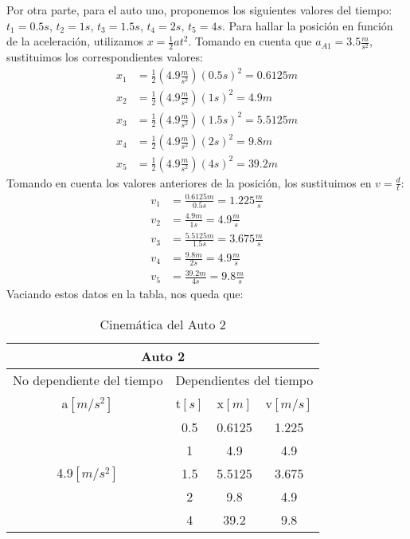 \documentclass[letterpaper,12pt]{article}
\begin{document}
\begin{enumerate}
Por otra parte, para el auto uno, proponemos los siguientes valores del tiempo: $t_1 = 0.5 s$, $t_2 = 1 s$, $t_3 = 1.5 s$, $t_4 = 2 s$, $t_5 = 4 s$. Para hallar la posición en función de la aceleración, utilizamos $x=\frac{1}{2} at^2$. Tomando en cuenta que $a_{A1}=3.5 \tfrac{m}{s^2}$, sustituimos los correspondientes valores:
\begin{align*}
    x_{1}&=\frac{1}{2}(4.9 \tfrac{m}{s^2})(0.5 s)^2 = 0.6125 m\\
    x_{2}&=\frac{1}{2}(4.9 \tfrac{m}{s^2})(1 s)^2 = 4.9 m\\
    x_{3}&=\frac{1}{2}(4.9 \tfrac{m}{s^2})(1.5 s)^2 = 5.5125 m \\
    x_{4}&=\frac{1}{2}(4.9 \tfrac{m}{s^2})(2 s)^2 = 9.8 m\\
    x_{5}&=\frac{1}{2}(4.9 \tfrac{m}{s^2})(4 s)^2 = 39.2 m
\end{align*}
Tomando en cuenta los valores anteriores de la posición, los sustituimos en $v=\frac{d}{t}$:
\begin{align*}
    v_{1}&=\frac{0.6125 m}{0.5 s}= 1.225 \tfrac{m}{s}\\
    v_{2}&=\frac{4.9 m}{1 s}= 4.9 \tfrac{m}{s}\\
    v_{3}&=\frac{5.5125 m}{1.5 s}= 3.675 \tfrac{m}{s}\\
    v_{4}&=\frac{9.8 m}{2 s}= 4.9\tfrac{m}{s} \\
    v_{5}&=\frac{39.2 m}{4 s}= 9.8 \tfrac{m}{s}
\end{align*}
Vaciando estos datos en la tabla, nos queda que:
\begin{table}[h]
\begin{center}
\begin{tabular}{ c | c | c | c | c |c }
\hline \hline
    \multicolumn{6}{c}{Auto 2} \\ \hline 
    \multicolumn{3}{c}{No dependiente del tiempo} & \multicolumn{3}{|c}{Dependientes del tiempo} \\ \hline
    \multicolumn{3}{c|}{a$[m/s^2]$} & t$[s]$ & x$[m]$ & v$[m/s]$\\ \hline
    \multicolumn{3}{c|}{\multirow{5}{*}{4.9$[m/s^2]$}}  & 0.5 & 0.6125 & 1.225 \tabularnewline \cline{4-6}
    \multicolumn{3}{c|}{\multirow{5}{*}{}}  & 1 & 4.9 & 4.9 \tabularnewline \cline{4-6}
    \multicolumn{3}{c|}{}  & 1.5 & 5.5125 & 3.675 \tabularnewline \cline{4-6}
    \multicolumn{3}{c|}{}  & 2 & 9.8 & 4.9 \tabularnewline \cline{4-6}
    \multicolumn{3}{c|}{}  & 4 & 39.2 & 9.8 \\ \hline \hline
\end{tabular}
\caption{Cinemática del Auto 2}
\label{tab:coches}
\end{center}
\end{table}


\end{enumerate}
\end{document}
